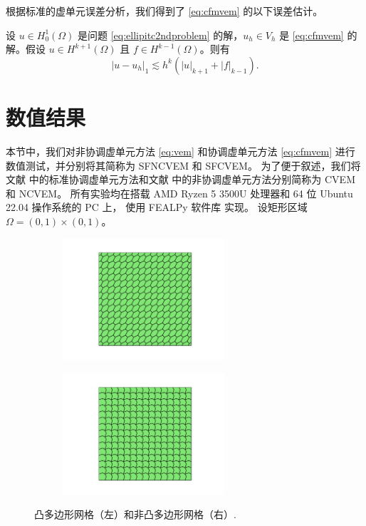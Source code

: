 根据标准的虚单元误差分析，我们得到了 \eqref{eq:cfmvem} 的以下误差估计。
\begin{theorem}\label{thm:cfmerrorestimateH1}
设 $u\in H_0^1(\Omega)$ 是问题 \eqref{eq:ellipitc2ndproblem} 的解，$u_h\in V_h$
是 \eqref{eq:cfmvem} 的解。假设 $u\in H^{k+1}(\Omega)$ 且 $f\in H^{k-1}(\Omega)$。则有
\begin{equation*}%
|u-u_h|_1\lesssim h^k(|u|_{k+1}+|f|_{k-1}).
\end{equation*}
\end{theorem}

\section{数值结果}\label{sec:numericalexamps}

本节中，我们对非协调虚单元方法 \eqref{eq:vem} 和协调虚单元方法 \eqref{eq:cfmvem}
进行数值测试，并分别将其简称为 SFNCVEM 和 SFCVEM。  
为了便于叙述，我们将文献 \cite{BeiraoBrezziCangianiManziniEtAl2013}
中的标准协调虚单元方法和文献 \cite{CangianiManziniSutton2017}
中的非协调虚单元方法分别简称为 CVEM 和 NCVEM。  
所有实验均在搭载 AMD Ryzen 5 3500U 处理器和 64 位 Ubuntu 22.04 操作系统的 PC 上，
使用 FEALPy 软件库 \cite{fealpy} 实现。  
设矩形区域 $\Omega = (0, 1) \times (0, 1)$。

\begin{figure}[H]
\centering
\begin{subfigure}[t]{0.425\linewidth}
    \centering
    \includegraphics[width=6.0cm]{./figures/stabfree/convex.pdf}
\end{subfigure}%
\hspace{1cm} %
\begin{subfigure}[t]{0.425\linewidth}
    \centering
    \includegraphics[width=6.0cm]{./figures/stabfree/nonconvex.pdf}
\end{subfigure}
\caption{凸多边形网格（左）和非凸多边形网格（右）.}
\label{fig:mesh}
\end{figure}

